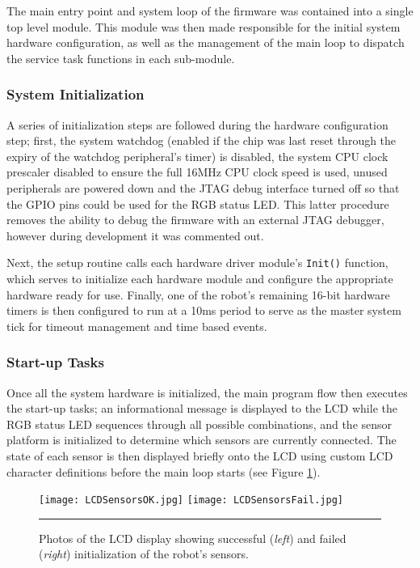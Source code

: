 The main entry point and system loop of the firmware was contained into a single top level module. This module was then made responsible for the initial system hardware configuration, as well as the management of the main loop to dispatch the service task functions in each sub-module.

\FloatBarrier
\subsubsection{System Initialization}

A series of initialization steps are followed during the hardware configuration step; first, the system watchdog (enabled if the chip was last reset through the expiry of the watchdog peripheral's timer) is disabled, the system CPU clock prescaler disabled to ensure the full 16MHz CPU clock speed is used, unused peripherals are powered down and the JTAG debug interface turned off so that the GPIO pins could be used for the RGB status LED. This latter procedure removes the ability to debug the firmware with an external JTAG debugger, however during development it was commented out.

Next, the setup routine calls each hardware driver module's \lstinline{Init()} function, which serves to initialize each hardware module and configure the appropriate hardware ready for use. Finally, one of the robot's remaining 16-bit hardware timers is then configured to run at a 10ms period to serve as the master system tick for timeout management and time based events.

\FloatBarrier
\subsubsection{Start-up Tasks}

Once all the system hardware is initialized, the main program flow then executes the start-up tasks; an informational message is displayed to the LCD while the RGB status LED sequences through all possible combinations, and the sensor platform is initialized to determine which sensors are currently connected. The state of each sensor is then displayed briefly onto the LCD using custom LCD character definitions before the main loop starts (see Figure \ref{fig:sensorinitlcd}).

\begin{figure}[tbph]
	\vspace{1em}
	\centering
		\texttt{[image: LCDSensorsOK.jpg]}
		\texttt{[image: LCDSensorsFail.jpg]}
	\rule{35em}{0.5pt}
	\caption[LCD Sensor Status Information]{Photos of the LCD display showing successful (\textit{left}) and failed (\textit{right}) initialization of the robot's sensors.}
	\label{fig:sensorinitlcd}
\end{figure}

